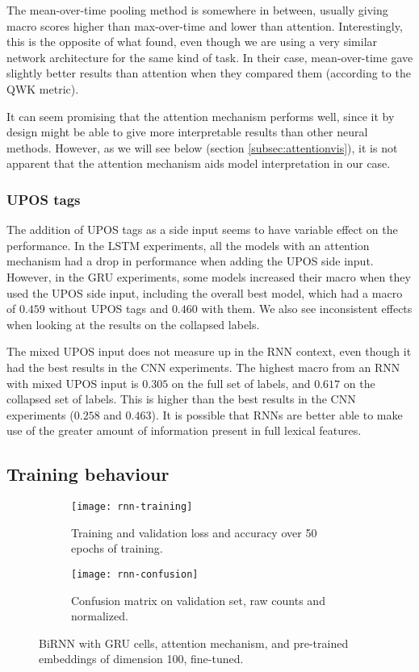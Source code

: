 The mean-over-time pooling method is somewhere in between, usually giving
macro \FI scores higher than max-over-time and lower than attention.
Interestingly, this is the opposite of what \textcite{taghipour16} found,
even though we are using a very similar network architecture for the same
kind of task. In their case, mean-over-time gave slightly better results than
attention when they compared them (according to the QWK metric).

It can seem promising that the attention mechanism performs well, since it by
design might be able to give more interpretable results than other neural
methods. However, as we will see below (section \ref{subsec:attentionvis}),
it is not apparent that the attention mechanism aids model interpretation in
our case.


\subsubsection{UPOS tags}

The addition of UPOS tags as a side input seems to have variable effect on
the performance. In the LSTM experiments, all the models with an attention
mechanism had a drop in performance when adding the UPOS side input. However,
in the GRU experiments, some models increased their macro \FI when they used
the UPOS side input, including the overall best model, which had a macro \FI
of $0.459$ without UPOS tags and $0.460$ with them. We also see inconsistent
effects when looking at the results on the collapsed labels.

The mixed UPOS input does not measure up in the RNN context, even though it
had the best results in the CNN experiments. The highest macro \FI from an
RNN with mixed UPOS input is $0.305$ on the full set of labels, and $0.617$
on the collapsed set of labels. This is higher than the best results in the
CNN experiments ($0.258$ and $0.463$). It is possible that RNNs are better
able to make use of the greater amount of information present in full lexical
features.


\subsection{Training behaviour}

\begin{figure}
  \begin{subfigure}{\linewidth}
    \centering
    \texttt{[image: rnn-training]}
    \caption{Training and validation loss and accuracy over 50 epochs of training.}
  \end{subfigure}
  \begin{subfigure}{\linewidth}
    \centering
    \texttt{[image: rnn-confusion]}
    \caption{Confusion matrix on validation set, raw counts and normalized.}
  \end{subfigure}
  \caption[Training behaviour of BiGRU with attention]{
    BiRNN with GRU cells, attention mechanism, and pre-trained
    embeddings of dimension 100, fine-tuned.
  }
  \label{fig:rnn-training}
\end{figure}


